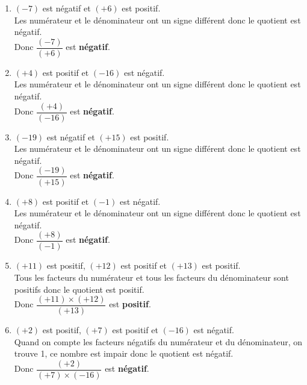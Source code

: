 \begin{corrige}
        \begin{enumerate}
            \item $ (-7) $ est négatif et $ (+6) $ est positif.\\
            Les numérateur et le dénominateur ont un signe différent donc le quotient est négatif.\\
           Donc $ \dfrac{(-7)}{(+6)} $ est {\bfseries \color[HTML]{f15929}négatif}.
            \item $ (+4) $ est positif et $ (-16) $ est négatif.\\
            Les numérateur et le dénominateur ont un signe différent donc le quotient est négatif.\\
           Donc $ \dfrac{(+4)}{(-16)} $ est {\bfseries \color[HTML]{f15929}négatif}.
            \item $ (-19) $ est négatif et $ (+15) $ est positif.\\
            Les numérateur et le dénominateur ont un signe différent donc le quotient est négatif.\\
           Donc $ \dfrac{(-19)}{(+15)} $ est {\bfseries \color[HTML]{f15929}négatif}.
            \item $ (+8) $ est positif et $ (-1) $ est négatif.\\
            Les numérateur et le dénominateur ont un signe différent donc le quotient est négatif.\\
           Donc $ \dfrac{(+8)}{(-1)} $ est {\bfseries \color[HTML]{f15929}négatif}.
            \item $ (+11) $ est positif, $ (+12) $ est positif et $ (+13) $ est positif.\\
           Tous les facteurs du numérateur et tous les facteurs du dénominateur sont positifs donc le quotient est positif.\\
          Donc $ \dfrac{(+11) \times (+12)}{(+13)} $ est {\bfseries \color[HTML]{f15929}positif}.
            \item $ (+2) $ est positif, $ (+7) $ est positif et $ (-16) $ est négatif.\\
           Quand on compte les facteurs négatifs du numérateur et du dénominateur, on trouve 1, ce nombre est impair donc le quotient est négatif.\\
          Donc $ \dfrac{(+2)}{(+7) \times (-16)} $ est {\bfseries \color[HTML]{f15929}négatif}.

\end{enumerate}
\end{corrige}
